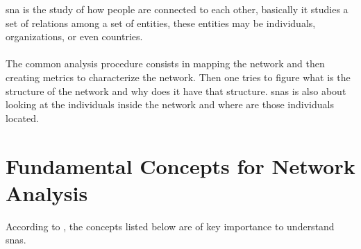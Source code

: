 \acrfull{sna} is the study of how people are connected to each other, basically it studies a set of relations among a set of entities,
these entities may be individuals, organizations, or even countries.\\\\
\indent The common analysis procedure consists in mapping the network and then creating metrics to
characterize the network. Then one tries to figure what is the structure of the network and why does
it have that structure. \glspl{sna} is also about looking at the individuals inside the network and where are those individuals located.

\section{Fundamental Concepts for Network Analysis}

According to \citep{wasserman1994social}, the concepts listed below are of key importance to understand \glspl{sna}.

